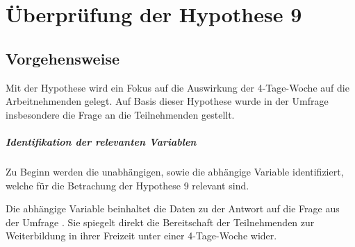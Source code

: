 
\chapter{Überprüfung der Hypothese 9}
\label{chap:hypothese9}

\section{Vorgehensweise}
Mit der Hypothese  wird ein Fokus auf die 
Auswirkung der 4-Tage-Woche auf die Arbeitnehmenden gelegt. Auf Basis dieser Hypothese 
wurde in der Umfrage
insbesondere die Frage  an die Teilnehmenden gestellt.

\paragraph*{Identifikation der relevanten Variablen}

Zu Beginn werden die unabhängigen, sowie die abhängige Variable identifiziert, welche für die Betrachung der
Hypothese 9 relevant sind.

Die abhängige Variable beinhaltet die Daten zu der Antwort auf die Frage aus der Umfrage
.
Sie spiegelt direkt die Bereitschaft der Teilnehmenden zur Weiterbildung in ihrer Freizeit 
unter einer 4-Tage-Woche wider.

